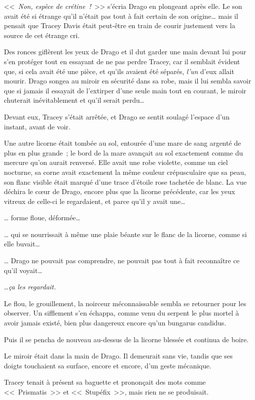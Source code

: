 <<~\emph{Non, espèce de crétine~!}~>> s'écria Drago en plongeant après elle. Le son avait été si étrange qu'il n'était pas tout à fait certain de son origine… mais il pensait que Tracey Davis était peut-être en train de courir justement vers la source de cet étrange cri.

Des ronces giflèrent les yeux de Drago et il dut garder une main devant lui pour s'en protéger tout en essayant de ne pas perdre Tracey, car il semblait évident que, si cela avait été une pièce, et qu'ils avaient été séparés, \emph{l'un} d'eux allait mourir. Drago songea au miroir en sécurité dans sa robe, mais il lui sembla savoir que si jamais il essayait de l'extirper d'une seule main tout en courant, le miroir chuterait inévitablement et qu'il serait perdu…

Devant eux, Tracey s'était arrêtée, et Drago se sentit soulagé l'espace d'un instant, avant de voir.

Une autre licorne était tombée au sol, entourée d'une mare de sang argenté de plus en plus grande~; le bord de la mare avançait au sol exactement comme du mercure qu'on aurait renversé. Elle avait une robe violette, comme un ciel nocturne, sa corne avait exactement la même couleur crépusculaire que sa peau, son flanc visible était marqué d'une trace d'étoile rose tachetée de blanc. La vue déchira le cœur de Drago, encore plus que la licorne précédente, car les yeux vitreux de celle-ci le regardaient, et parce qu'il y avait une…

… forme floue, déformée…

… qui se nourrissait à même une plaie béante sur le flanc de la licorne, comme si elle buvait…

… Drago ne pouvait pas comprendre, ne pouvait pas tout à fait reconnaître ce qu'il voyait…

…\emph{ça les regardait.}

Le flou, le grouillement, la noirceur méconnaissable sembla se retourner pour les observer. Un sifflement s'en échappa, comme venu du serpent le plus mortel à avoir jamais existé, bien plus dangereux encore qu'un bungarus candidus.

Puis il se pencha de nouveau au-dessus de la licorne blessée et continua de boire.

Le miroir était dans la main de Drago. Il demeurait sans vie, tandis que ses doigts touchaient sa surface, encore et encore, d'un geste mécanique.

Tracey tenait à présent sa baguette et prononçait des mots comme <<~Prismatis~>> et <<~Stupéfix~>>, mais rien ne se produisait.

